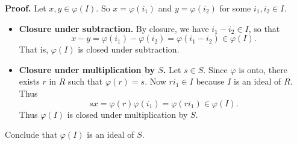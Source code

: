 \begin{enumerate}
\begin{enumerate}
               \textbf{Proof.} Let $x, y \in \varphi(I)$. So $x = \varphi(i_1)$
               and $y = \varphi(i_2)$ for some $i_1, i_2 \in I$.
               \begin{itemize}
                  \item \textbf{Closure under subtraction.} By closure, we have
                        $i_1 - i_2 \in I$, so that
                        $$x - y = \varphi(i_1)-\varphi(i_2) =
                          \varphi(i_1 - i_2)\in \varphi(I).$$
                        That is, $\varphi(I)$ is closed under subtraction.
                  \item \textbf{Closure under multiplication by $S$.} Let
                        $s \in S$. Since $\varphi$ is onto, there exists $r$ in
                        $R$ such that $\varphi(r) = s$. Now $ri_1 \in I$
                        because $I$ is an ideal of $R$. Thus
                        $$sx = \varphi(r)\varphi(i_1) =
                          \varphi(ri_1) \in \varphi(I).$$
                        Thus $\varphi(I)$ is closed under multiplication by $S$.
               \end{itemize}

               Conclude that $\varphi(I)$ is an ideal of $S$.


\end{enumerate}
\end{enumerate}
